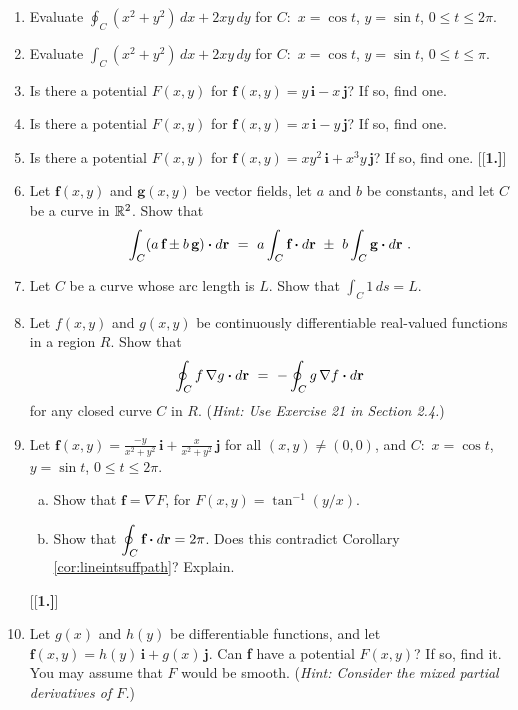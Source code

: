 \begin{enumerate}[\bfseries 1.]
 \item Evaluate $\displaystyle\oint_C (x^2 + y^2 )\,dx + 2xy\,dy$ for $C:$ $x=\cos t$, $y=\sin t$, $0\le t\le 2\pi$.
 \item Evaluate $\displaystyle\int_C (x^2 + y^2 )\,dx + 2xy\,dy$ for $C:$ $x=\cos t$, $y=\sin t$, $0\le t\le \pi$.
 \item Is there a potential $F(x,y)$ for $\textbf{f}(x,y) = y\,\textbf{i} - x\,\textbf{j}$? If so, find one.
 \item Is there a potential $F(x,y)$ for $\textbf{f}(x,y) = x\,\textbf{i} - y\,\textbf{j}$? If so, find one.
 \item Is there a potential $F(x,y)$ for $\textbf{f}(x,y) = xy^2\,\textbf{i} + x^3 y\,\textbf{j}$? If so, find
  one.
[{[\bfseries 1.]}]
 \item Let $\textbf{f}(x,y)$ and $\textbf{g}(x,y)$ be vector fields, let $a$ and $b$ be constants, and let $C$ be
  a curve in $\mathbb{R}^{2}$. Show that
  \begin{displaymath}
   \int_{C}(a\,\textbf{f} \pm b\,\textbf{g}) \bm{\cdot} d\textbf{r} ~=~ a \int_{C}\textbf{f} \bm{\cdot} d\textbf{r} ~\pm~
   b \int_{C}\textbf{g} \bm{\cdot} d\textbf{r} ~.
  \end{displaymath}
 \item Let $C$ be a curve whose arc length is $L$. Show that $\int_C 1\,ds = L$.
 \item Let $f(x,y)$ and $g(x,y)$ be continuously differentiable real-valued functions in a region $R$. Show that
  \begin{displaymath}
   \oint_{C}f\,\nabla g \bm{\cdot} d\textbf{r} ~=~ -\oint_{C}g\,\nabla f \bm{\cdot} d\textbf{r}
  \end{displaymath}
  for any closed curve $C$ in $R$. (\emph{Hint: Use Exercise 21 in Section 2.4.})
 \item Let $\textbf{f}(x,y)=\frac{-y}{x^2 + y^2}\,\textbf{i} + \frac{x}{x^2 + y^2}\,\textbf{j}$ for all $(x,y)\ne(0,0)$,
  and $C:$ $x=\cos t$, $y=\sin t$, $0\le t\le 2\pi$.
  \begin{enumerate}[(a)]
   \item Show that $\textbf{f} = \nabla F$, for $F(x,y) = \tan^{-1}(y/x)$.
   \item Show that $\displaystyle\oint_{C} \textbf{f} \bm{\cdot} d\textbf{r} = 2\pi$. Does this contradict Corollary
    \ref{cor:lineintsuffpath}? Explain.
  \end{enumerate}
[{[\bfseries 1.]}]
 \item Let $g(x)$ and $h(y)$ be differentiable functions, and let $\textbf{f}(x,y)=h(y)\,\textbf{i} + g(x)\,\textbf{j}$.
  Can \textbf{f} have a potential $F(x,y)$? If so, find it. You may assume that $F$ would be smooth. (\emph{Hint:
  Consider the mixed partial derivatives of $F$.})
\end{enumerate}
\newpage
